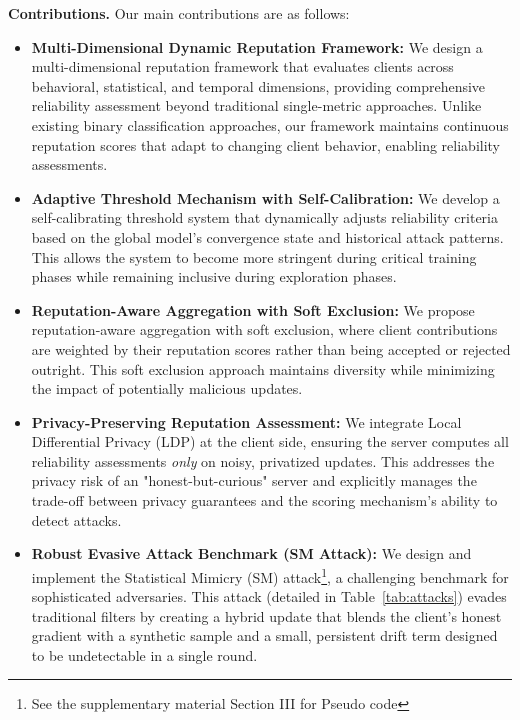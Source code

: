 \documentclass[lettersize,journal]{IEEEtran}
\begin{document}
\textbf{Contributions.} Our main contributions are as follows:
\begin{itemize}[wide]
    \item[\textbf{C1)}] \textbf{Multi-Dimensional Dynamic Reputation Framework:} We design a multi-dimensional reputation framework that evaluates clients across behavioral, statistical, and temporal dimensions, providing comprehensive reliability assessment beyond traditional single-metric approaches. Unlike existing binary classification approaches, our framework maintains continuous reputation scores that adapt to changing client behavior, enabling reliability assessments.
    
    \item[\textbf{C2)}] \textbf{Adaptive Threshold Mechanism with Self-Calibration:} We develop a self-calibrating threshold system that dynamically adjusts reliability criteria based on the global model's convergence state and historical attack patterns. This allows the system to become more stringent during critical training phases while remaining inclusive during exploration phases.
    
    \item[\textbf{C3)}] \textbf{Reputation-Aware Aggregation with Soft Exclusion:} We propose reputation-aware aggregation with soft exclusion, where client contributions are weighted by their reputation scores rather than being accepted or rejected outright. This soft exclusion approach maintains diversity while minimizing the impact of potentially malicious updates.
    
    \item[\textbf{C4)}] \textbf{Privacy-Preserving Reputation Assessment:} We integrate Local Differential Privacy (LDP) at the client side, ensuring the server computes all reliability assessments \textit{only} on noisy, privatized updates. This addresses the privacy risk of an "honest-but-curious" server and explicitly manages the trade-off between privacy guarantees and the scoring mechanism's ability to detect attacks.
    
     \item[\textbf{C5)}] \textbf{Robust Evasive Attack Benchmark (SM Attack):} We design and implement the Statistical Mimicry (SM) attack\footnote{See the supplementary material Section III for Pseudo code}, a challenging benchmark for sophisticated adversaries. This attack (detailed in Table~\ref{tab:attacks}) evades traditional filters by creating a hybrid update that blends the client's honest gradient with a synthetic sample and a small, persistent drift term designed to be undetectable in a single round.

\end{itemize}
\end{document}

